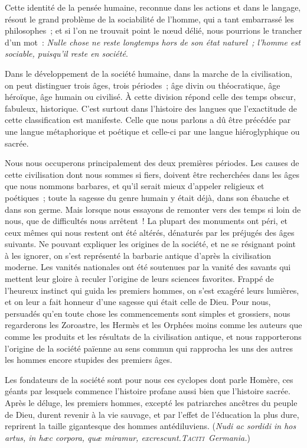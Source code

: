 \documentclass[french,twoside]{book} %
\begin{document}
Cette identité de la pensée humaine, reconnue dans les actions et dans le langage, résout le grand problème de la sociabilité de l’homme, qui a tant embarrassé les philosophes ; et si l’on ne trouvait point le nœud délié, nous pourrions le trancher  d’un mot : {\itshape Nulle chose ne reste longtemps hors de son état naturel ; l’homme est sociable, puisqu’il reste en société}.\par
Dans le développement de la société humaine, dans la marche de la civilisation, on peut distinguer trois âges, trois périodes ; âge divin ou théocratique, âge héroïque, âge humain ou civilisé. À cette division répond celle des temps obscur, fabuleux, historique. C’est surtout dans l’histoire des langues que l’exactitude de cette classification est manifeste. Celle que nous parlons a dû être précédée par une langue métaphorique et poétique et celle-ci par une langue hiéroglyphique ou sacrée.\par
Nous nous occuperons principalement des deux premières périodes. Les causes de cette civilisation dont nous sommes si fiers, doivent être recherchées dans les âges que nous nommons barbares, et qu’il serait mieux d’appeler religieux et poétiques ; toute la sagesse du genre humain y était déjà, dans son ébauche et dans son germe. Mais lorsque nous essayons de remonter vers des temps si loin de nous, que de difficultés nous arrêtent ! La plupart des monuments ont péri, et ceux mêmes qui nous restent ont été altérés, dénaturés par les préjugés des âges suivants. Ne pouvant expliquer les origines de la société, et ne se résignant point à les ignorer, on s’est représenté la barbarie antique  d’après la civilisation moderne. Les vanités nationales ont été soutenues par la vanité des savants qui mettent leur gloire à reculer l’origine de leurs sciences favorites. Frappé de l’heureux instinct qui guida les premiers hommes, on s’est exagéré leurs lumières, et on leur a fait honneur d’une sagesse qui était celle de Dieu. Pour nous, persuadés qu’en toute chose les commencements sont simples et grossiers, nous regarderons les Zoroastre, les Hermès et les Orphées moins comme les auteurs que comme les produits et les résultats de la civilisation antique, et nous rapporterons l’origine de la société païenne au sens commun qui rapprocha les uns des autres les hommes encore stupides des premiers âges.\par
Les fondateurs de la société sont pour nous ces cyclopes dont parle Homère, ces géants par lesquels commence l’histoire profane aussi bien que l’histoire sacrée. Après le déluge, les premiers hommes, excepté les patriarches ancêtres du peuple de Dieu, durent revenir à la vie sauvage, et par l’effet de l’éducation la plus dure, reprirent la taille gigantesque des hommes antédiluviens. (\emph{{\itshape Nudi ac sordidi in hos artus, in hæc corpora, quæ miramur, excrescunt.}{\scshape Taciti} {\itshape  Germania.}})\par
\end{document}
